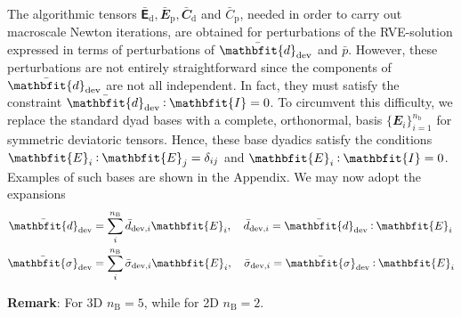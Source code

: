 \documentclass[12pt,a4paper,fleqn]{article}
\renewcommand{\ts}[1]{\mathbfit{#1}}
\renewcommand{\tf}[1]{\mathbfsfup{#1}}
\newcommand{\ded}{\mathrm{d}}
\newcommand{\dep}{\mathrm{p}}
\begin{document}
The algorithmic tensors $\bar{\tf{E}}_\ded, \bar{\ts E }_\dep, \bar{\ts C}_\ded$ and $\bar{C}_\dep$, needed in order to carry out macroscale Newton iterations, are obtained for
perturbations of the RVE-solution expressed in terms of perturbations of $\bar{\ts d}_\dev$ and $\bar{p}$.
However, these perturbations are not entirely straightforward since the components of $\bar{\ts d}_\dev$ are not all independent.
In fact, they must satisfy the constraint $\bar{\ts d}_\dev\dprod{\ts I}=0$.
To circumvent this difficulty, we replace the standard dyad bases with a complete, orthonormal, basis $\{\ts E_i\}_{i=1}^{n_{\mathrm{b}}}$ for symmetric deviatoric tensors.
Hence, these base dyadics satisfy the conditions $\ts E_i \dprod \ts E_j = \delta_{ij}$ and $\ts E_i\dprod{\ts I}=0$.
Examples of such bases are shown in the Appendix. We may now adopt the expansions
\begin{align}
 \bar{\ts d}_\dev &= \sum_i^{n_{\mathrm{B}}} \bar{d}_{\dev,i} \ts E_i,\quad  \bar{d}_{\dev,i} = \bar{\ts d}_\dev\dprod \ts E_i
\label{eq:901} \\
 \bar{\ts\sigma}_\dev &= \sum_i^{n_{\mathrm{B}}} \bar{\sigma}_{\dev,i} \ts E_i,\quad \bar{\sigma}_{\dev,i} = \bar{\ts\sigma}_\dev\dprod \ts E_i
\label{eq:902}
\end{align}

\textbf{Remark}: For 3D $n_{\mathrm{B}} = 5$, while for 2D $n_{\mathrm{B}} = 2$.
\end{document}
